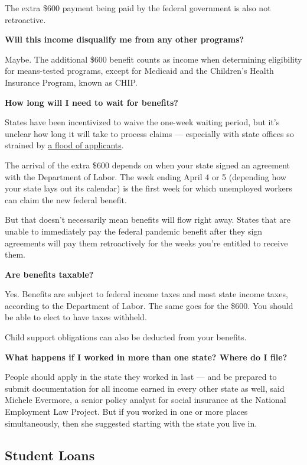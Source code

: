 The extra \$600 payment being paid by the federal government is also not
retroactive.

\textbf{Will this income disqualify me from any other programs?}

Maybe. The additional \$600 benefit counts as income when determining
eligibility for means-tested programs, except for Medicaid and the
Children's Health Insurance Program, known as CHIP.

\textbf{How long will I need to wait for benefits?}

States have been incentivized to waive the one-week waiting period, but
it's unclear how long it will take to process claims --- especially with
state offices so strained by
\href{https://www.nytimes.com/2020/03/19/business/coronavirus-unemployment-states.html}{a
flood of applicants}.

The arrival of the extra \$600 depends on when your state signed an
agreement with the Department of Labor. The week ending April 4 or 5
(depending how your state lays out its calendar) is the first week for
which unemployed workers can claim the new federal benefit.

But that doesn't necessarily mean benefits will flow right away. States
that are unable to immediately pay the federal pandemic benefit after
they sign agreements will pay them retroactively for the weeks you're
entitled to receive them.

\textbf{Are benefits taxable?}

Yes. Benefits are subject to federal income taxes and most state income
taxes, according to the Department of Labor. The same goes for the
\$600. You should be able to elect to have taxes withheld.

Child support obligations can also be deducted from your benefits.

\textbf{What happens if I worked in more than one state? Where do I
file?}

People should apply in the state they worked in last --- and be prepared
to submit documentation for all income earned in every other state as
well, said Michele Evermore, a senior policy analyst for social
insurance at the National Employment Law Project. But if you worked in
one or more places simultaneously, then she suggested starting with the
state you live in.

\hypertarget{student-loans}{%
\subsection{Student Loans}\label{student-loans}}

